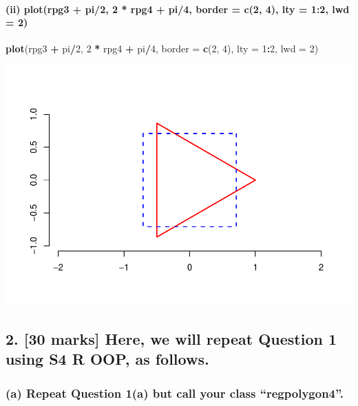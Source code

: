 \documentclass[]{article}
\newenvironment{Shaded}{\begin{snugshade}}{\end{snugshade}}
\newcommand{\KeywordTok}[1]{\textcolor[rgb]{0.13,0.29,0.53}{\textbf{#1}}}
\newcommand{\DataTypeTok}[1]{\textcolor[rgb]{0.13,0.29,0.53}{#1}}
\newcommand{\DecValTok}[1]{\textcolor[rgb]{0.00,0.00,0.81}{#1}}
\newcommand{\StringTok}[1]{\textcolor[rgb]{0.31,0.60,0.02}{#1}}
\newcommand{\OperatorTok}[1]{\textcolor[rgb]{0.81,0.36,0.00}{\textbf{#1}}}
\newcommand{\NormalTok}[1]{#1}
\let\oldparagraph\paragraph
\renewcommand{\paragraph}[1]{\oldparagraph{#1}\mbox{}}
\begin{document}
\paragraph{(ii) plot(rpg3 + pi/2, 2 * rpg4 + pi/4, border = c(2, 4), lty
= 1:2, lwd =
2)}\label{ii-plotrpg3-pi2-2-rpg4-pi4-border-c2-4-lty-12-lwd-2}

\begin{Shaded}
\begin{Highlighting}[]
\KeywordTok{plot}\NormalTok{(rpg3 }\OperatorTok{+}\StringTok{ }\NormalTok{pi}\OperatorTok{/}\DecValTok{2}\NormalTok{, }\DecValTok{2} \OperatorTok{*}\StringTok{ }\NormalTok{rpg4 }\OperatorTok{+}\StringTok{ }\NormalTok{pi}\OperatorTok{/}\DecValTok{4}\NormalTok{, }\DataTypeTok{border =} \KeywordTok{c}\NormalTok{(}\DecValTok{2}\NormalTok{, }\DecValTok{4}\NormalTok{), }\DataTypeTok{lty =} \DecValTok{1}\OperatorTok{:}\DecValTok{2}\NormalTok{, }\DataTypeTok{lwd =} \DecValTok{2}\NormalTok{)}
\end{Highlighting}
\end{Shaded}

\includegraphics{Assigment4_files/figure-latex/unnamed-chunk-6-1.pdf}

\subsection{2. {[}30 marks{]} Here, we will repeat Question 1 using S4 R
OOP, as
follows.}\label{marks-here-we-will-repeat-question-1-using-s4-r-oop-as-follows.}

\subsubsection{\texorpdfstring{(a) Repeat Question 1(a) but call your
class
``regpolygon4''.}{(a) Repeat Question 1(a) but call your class regpolygon4.}}\label{a-repeat-question-1a-but-call-your-class-regpolygon4.}
\end{document}
